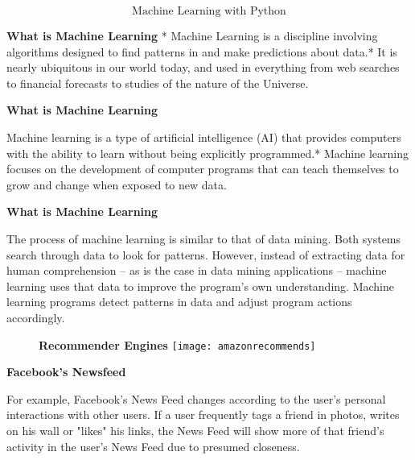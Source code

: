 

 
 
  
  \huge
  \[ \mbox{Machine Learning with Python} \]
  
 
 
 
\textbf{What is Machine Learning}
* Machine Learning is a discipline involving algorithms designed to find patterns in and make predictions about data.* It is nearly ubiquitous in our world today, and used in everything from web searches to financial forecasts to studies of the nature of the Universe. 
 
 

 


 
 
\textbf{What is Machine Learning}
 
  
Machine learning is a type of artificial intelligence (AI) that provides computers with the ability to learn without being explicitly programmed.* Machine learning focuses on the development of computer programs that can teach themselves to grow and change when exposed to new data. 
 
 

 
 
\textbf{What is Machine Learning}
 
  The process of machine learning is similar to that of data mining. Both systems search through data to look for patterns. 
  However, instead of extracting data for human comprehension -- as is the case in data mining applications -- machine learning uses that data to improve the program's own understanding.  Machine learning programs detect patterns in data and adjust program actions accordingly. 
 
 
% 
%
% 
 
 \begin{figure}
\textbf{ Recommender Engines}
\centering
\texttt{[image: amazonrecommends]}

\end{figure}

 
  

 
  
 \textbf{Facebook's Newsfeed}
  
  For example, Facebook's News Feed changes according to the user's personal interactions with other users. 
  If a user frequently tags a friend in photos, writes on his wall or "likes" his links, the News Feed will show more of that friend's activity in the user's News Feed due to presumed closeness.
  
 
 
 
